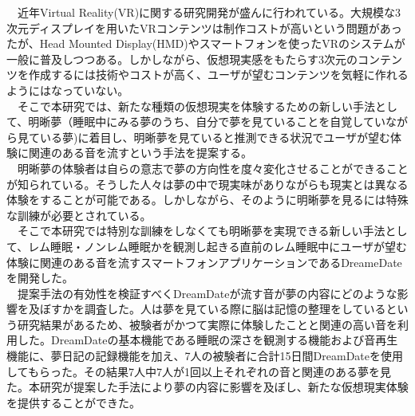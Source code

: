 
\begin{jabstract}
　近年Virtual Reality(VR)に関する研究開発が盛んに行われている。大規模な3次元ディスプレイを用いたVRコンテンツは制作コストが高いという問題があったが、Head Mounted Display(HMD)やスマートフォンを使ったVRのシステムが一般に普及しつつある。しかしながら、仮想現実感をもたらす3次元のコンテンツを作成するには技術やコストが高く、ユーザが望むコンテンツを気軽に作れるようにはなっていない。\\
　そこで本研究では、新たな種類の仮想現実を体験するための新しい手法として、明晰夢（睡眠中にみる夢のうち、自分で夢を見ていることを自覚していながら見ている夢)に着目し、明晰夢を見ていると推測できる状況でユーザが望む体験に関連のある音を流すという手法を提案する。\\
　明晰夢の体験者は自らの意志で夢の方向性を度々変化させることができることが知られている。そうした人々は夢の中で現実味がありながらも現実とは異なる体験をすることが可能である。しかしながら、そのように明晰夢を見るには特殊な訓練が必要とされている。 \\
　そこで本研究では特別な訓練をしなくても明晰夢を実現できる新しい手法として、レム睡眠・ノンレム睡眠かを観測し起きる直前のレム睡眠中にユーザが望む体験に関連のある音を流すスマートフォンアプリケーションであるDreameDateを開発した。\\
　提案手法の有効性を検証すべくDreamDateが流す音が夢の内容にどのような影響を及ぼすかを調査した。人は夢を見ている際に脳は記憶の整理をしているという研究結果があるため、被験者がかつて実際に体験したことと関連の高い音を利用した。DreamDateの基本機能である睡眠の深さを観測する機能および音再生機能に、夢日記の記録機能を加え、7人の被験者に合計15日間DreamDateを使用してもらった。その結果7人中7人が1回以上それぞれの音と関連のある夢を見た。本研究が提案した手法により夢の内容に影響を及ぼし、新たな仮想現実体験を提供することができた。


\end{jabstract}

